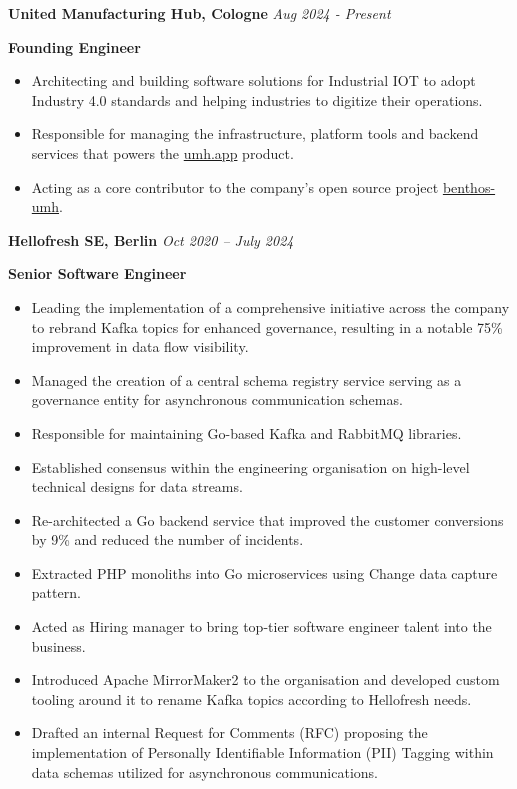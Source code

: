 \documentclass[11pt, oneside]{article}
\begin{document}
\medskip

\textbf{United Manufacturing Hub, Cologne}
\hfill
\textit{Aug 2024 - Present}

\textbf{Founding Engineer}

\begin{itemize}
  \item Architecting and building software solutions for Industrial IOT to adopt Industry 4.0 standards and helping industries to digitize their operations.
  \item Responsible for managing the infrastructure, platform tools and backend services that powers the \href{https://www.umh.app/product/overview}{umh.app} product.
  \item Acting as a core contributor to the company's open source project \href{https://github.com/united-manufacturing-hub/benthos-umh}{benthos-umh}.
\end{itemize}

\medskip

\textbf{Hellofresh SE, Berlin}
\hfill
\textit{Oct 2020 – July 2024}

\textbf{Senior Software Engineer}

\begin{itemize}
  \item Leading the implementation of a comprehensive initiative across the company to rebrand Kafka topics for enhanced governance, resulting in a notable 75\% improvement in data flow visibility.
  \item Managed the creation of a central schema registry service serving as a governance entity for asynchronous communication schemas. 
  \item Responsible for maintaining Go-based Kafka and RabbitMQ libraries. 
  \item Established consensus within the engineering organisation on high-level technical designs for data streams.
  \item Re-architected a Go backend service that improved the customer conversions by 9\% and reduced the number of incidents.
  \item Extracted PHP monoliths into Go microservices using Change data capture pattern.
  \item Acted as Hiring manager to bring top-tier software engineer talent into the business. 
  \item Introduced Apache MirrorMaker2 to the organisation and developed custom tooling around it to rename Kafka topics according to Hellofresh needs.
  \item Drafted an internal Request for Comments (RFC) proposing the implementation of Personally Identifiable Information (PII) Tagging within data schemas utilized for asynchronous communications.

\end{itemize}
\end{document}
